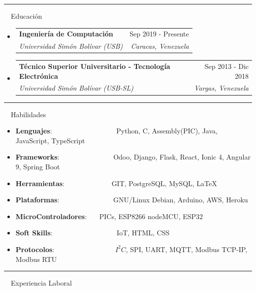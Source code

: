 \documentclass[a4paper,20pt]{article}
\makeatletter
\newcommand{\resumeItem}[2]{
  \item\small{
    \textbf{#1}{: #2 \vspace{-2pt}}
  }
}
\newcommand{\resumeSubheading}[4]{
  \vspace{-1pt}\item
    \begin{tabular*}{0.97\textwidth}{l@{\extracolsep{\fill}}r}
      \textbf{#1} & #2 \\
      \textit{#3} & \textit{#4} \\
    \end{tabular*}\vspace{-5pt}
}
\newcommand{\resumeSubItem}[2]{\resumeItem{#1}{#2}\vspace{-3pt}}
\newcommand{\resumeSubHeadingListStart}{\begin{itemize}[leftmargin=*]}
\newcommand{\resumeSubHeadingListEnd}{\end{itemize}}
\makeatother
\begin{document}
\vspace{10pt}
 \textcolor{NavyBlue}{ \rule[1mm]{2cm}{2mm} {\LARGE ~~Educación}}
\vspace{2pt}

  \resumeSubHeadingListStart
    \resumeSubheading
    {Ingeniería de Computación}{Sep 2019 - Presente}
      {Universidad Simón Bolívar (USB)}{Caracas, Venezuela}
    \resumeSubHeadingListEnd
    
   \resumeSubHeadingListStart
    \resumeSubheading
    {Técnico Superior Universitario - Tecnología Electrónica}{Sep 2013 - Dic 2018}
      {Universidad Simón Bolívar (USB-SL)}{Vargas, Venezuela}
    \resumeSubHeadingListEnd
	    
\vspace{10pt}
 \textcolor{NavyBlue}{ \rule[1mm]{2cm}{2mm} {\LARGE ~~Habilidades}}
\vspace{2pt}


\resumeSubHeadingListStart

	\resumeSubItem{Lenguajes}{~~~~~~~~~~~~~~~~~~Python, C, Assembly(PIC), Java, JavaScript, TypeScript}
	\resumeSubItem{Frameworks}{~~~~~~~~~~~~~~~Odoo, Django, Flask, React, Ionic 4, Angular 9, Spring Boot}
	\resumeSubItem{Herramientas}{~~~~~~~~~~~~~GIT, PostgreSQL, MySQL, \LaTeX{}}
	\resumeSubItem{Plataformas}{~~~~~~~~~~~~~~~GNU/Linux Debian, Arduino, AWS, Heroku}
	\resumeSubItem{MicroControladores}{~~~PICs, ESP8266 nodeMCU, ESP32}
	\resumeSubItem{Soft Skills}{~~~~~~~~~~~~~~~~~~IoT, HTML, CSS}
	\resumeSubItem{Protocolos}{~~~~~~~~~~~~~~~~~$I^{2}C$, SPI, UART, MQTT, Modbus TCP-IP, Modbus RTU}

\resumeSubHeadingListEnd



\vspace{10pt}
 \textcolor{NavyBlue}{ \rule[1mm]{2cm}{2mm} {\LARGE ~~Experiencia Laboral}}
\vspace{2pt}
\end{document}
